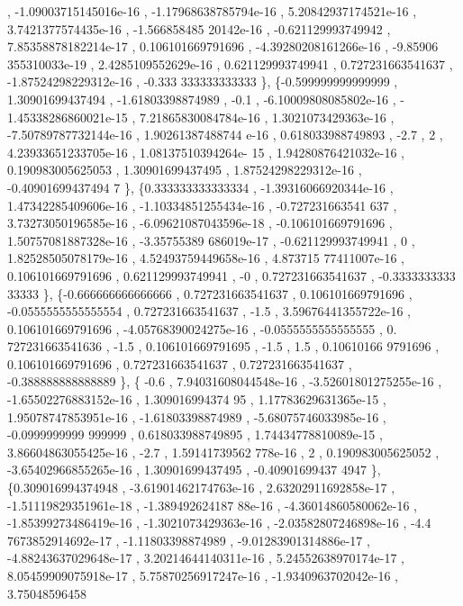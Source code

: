 \begin{DoxyCode}
       , -1.09003715145016e-16 , -1.17968638785794e-16 , 5.20842937174521e-16 , 3.7421377574435e-16 , -1.566858485
      20142e-16 , -0.621129993749942 , 7.85358878182214e-17 , 0.106101669791696 , -4.39280208161266e-16 , -9.85906
      355310033e-19 , 2.4285109552629e-16 , 0.621129993749941 , 0.727231663541637 , -1.87524298229312e-16 , -0.333
      333333333333 \},
\{-0.599999999999999 ,  1.30901699437494 , -1.61803398874989 ,              -0.1 , -6.10009808085802e-16 , -
      1.45338286860021e-15 , 7.21865830084784e-16 , 1.3021073429363e-16 , -7.50789787732144e-16 , 1.90261387488744
      e-16 , 0.618033988749893 ,              -2.7 ,                 2 , 4.23933651233705e-16 , 1.08137510394264e-
      15 , 1.94280876421032e-16 , 0.190983005625053 ,  1.30901699437495 , 1.87524298229312e-16 , -0.40901699437494
      7 \},
\{0.333333333333334 , -1.39316066920344e-16 , 1.47342285409606e-16 , -1.10334851255434e-16 , -0.727231663541
      637 , 3.73273050196585e-16 , -6.09621087043596e-18 , -0.106101669791696 , 1.50757081887328e-16 , -3.35755389
      686019e-17 , -0.621129993749941 ,                 0 , 1.82528505078179e-16 , 4.52493759449658e-16 , 4.873715
      77411007e-16 , 0.106101669791696 , 0.621129993749941 ,                -0 , 0.727231663541637 , -0.3333333333
      33333 \},
\{-0.666666666666666 , 0.727231663541637 , 0.106101669791696 , -0.0555555555555554 , 0.727231663541637 ,    
                -1.5 , 3.59676441355722e-16 , 0.106101669791696 , -4.05768390024275e-16 , -0.0555555555555555 , 0.
      727231663541636 ,              -1.5 , 0.106101669791695 ,              -1.5 ,               1.5 , 0.10610166
      9791696 , 0.106101669791696 , 0.727231663541637 , 0.727231663541637 , -0.388888888888889 \},
\{             -0.6 , 7.94031608044548e-16 , -3.52601801275255e-16 , -1.65502276883152e-16 ,  1.309016994374
      95 , 1.17783629631365e-15 , 1.95078747853951e-16 , -1.61803398874989 , -5.68075746033985e-16 , -0.0999999999
      999999 , 0.618033988749895 , 1.74434778810089e-15 , 3.86604863055425e-16 ,              -2.7 , 1.59141739562
      778e-16 ,                 2 , 0.190983005625052 , -3.65402966855265e-16 ,  1.30901699437495 , -0.40901699437
      4947 \},
\{0.309016994374948 , -3.61901462174763e-16 , 2.63202911692858e-17 , -1.51119829351961e-18 , -1.389492624187
      88e-16 , -4.36014860580062e-16 , -1.85399273486419e-16 , -1.3021073429363e-16 , -2.03582807246898e-16 , -4.4
      7673852914692e-17 , -1.11803398874989 , -9.01283901314886e-17 , -4.88243637029648e-17 , 3.20214644140311e-16
       , 5.24552638970174e-17 , 8.05459909075918e-17 , 5.75870256917247e-16 , -1.9340963702042e-16 , 3.75048596458

\end{DoxyCode}
